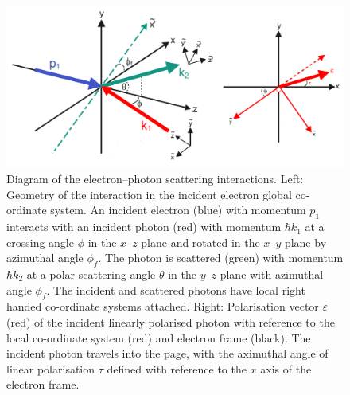 \documentclass[../main.tex]{subfiles}
\begin{document}
\begin{figure}[!h]
\centering
\includegraphics[width=\textwidth]{Figures/Photon_Production_by_Inverse_Compton_Scattering/ICS_interaction_polarisation.pdf}
\caption{Diagram of the electron--photon scattering interactions. Left: Geometry of the interaction in the incident electron global co-ordinate system. An incident electron (blue) with momentum $p_{1}$ interacts with an incident photon (red) with momentum $\hbar k_{1}$ at a crossing angle $\phi$ in the $x$--$z$ plane and rotated in the $x$--$y$ plane by azimuthal angle $\phi_{f}$. The photon is scattered (green) with momentum $\hbar k_{2}$ at a polar scattering angle $\theta$ in the $y$--$z$ plane with azimuthal angle $\phi_{f}$. The incident and scattered photons have local right handed co-ordinate systems attached.  Right: Polarisation vector $\varepsilon$ (red) of the incident linearly polarised photon with reference to the local co-ordinate system (red) and electron frame (black). The incident photon travels into the page, with the aximuthal angle of linear polarisation $\tau$ defined with reference to the $x$ axis of the electron frame.}
\label{fig:3D_coord_system}
\end{figure}
\end{document}

